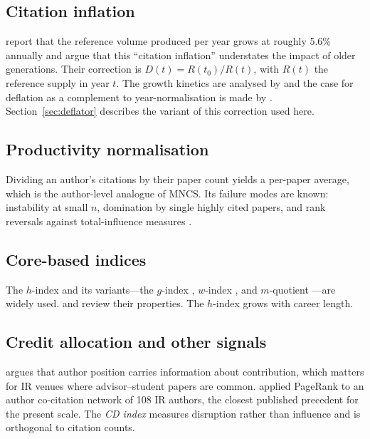 \documentclass{article}
\begin{document}
\subsection{Citation inflation}

\citet{petersen2019inflation} report that the reference volume produced per year grows at roughly 5.6\%
annually and argue that this ``citation inflation'' understates the impact of older generations.
Their correction is $D(t) = R(t_0)/R(t)$, with $R(t)$ the reference supply in year $t$. The growth
kinetics are analysed by \citet{pan2018memory} and the case for deflation as a complement to
year-normalisation is made by \citet{ioannidis2014most}. Section~\ref{sec:deflator} describes the
variant of this correction used here.

\subsection{Productivity normalisation}

Dividing an author's citations by their paper count yields a per-paper average, which is the
author-level analogue of MNCS. Its failure modes are known: instability at small $n$, domination
by single highly cited papers, and rank reversals against total-influence measures
\citep{waltman2019chapter}.

\subsection{Core-based indices}

The $h$-index \citep{hirsch2005index} and its variants---the $g$-index \citep{egghe2006gindex}, $w$-index
\citep{wu2010windex}, and $m$-quotient \citep{burrell2007core}---are widely used. \citet{alonso2009review} and
\citet{wildgaard2014108} review their properties. The $h$-index grows with career length.

\subsection{Credit allocation and other signals}

\citet{vavrycuk2018influential} argues that author position carries information about contribution, which
matters for IR venues where advisor--student papers are common. \citet{ding2011pagerank} applied
PageRank to an author co-citation network of 108 IR authors, the closest published precedent for
the present scale. The \emph{CD index} \citep{funk2017cdindex, wu2019teams} measures disruption rather than
influence and is orthogonal to citation counts.
\end{document}
